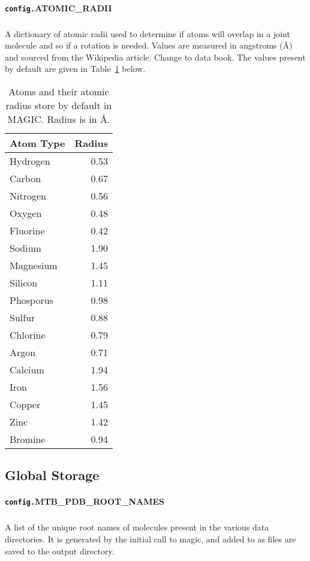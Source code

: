 \documentclass[a4paper,11pt,oneside,openright]{book}
\begin{document}
{\paragraph[\texttt{ATOMIC\_RADII}]{\texttt{config.}\textbf{ATOMIC\_RADII}}
\subparagraph{}A dictionary of atomic radii used to determine if atoms will overlap in a joint molecule and so if a rotation is needed. Values are measured in angstroms (\AA) and sourced from the Wikipedia article. {\color{red}Change to data book}. The values present by default are given in Table~\ref{tb:atomicradii} below.
\begin{table}[!htb]
\caption{Atoms and their atomic radius store by default in MAGIC. Radius is in \AA.}\label{tb:atomicradii}
\centering
\begin{tabular}{| l | r |}
\hline
Atom Type & Radius \\
\hline\hline
Hydrogen & 0.53 \\
Carbon & 0.67 \\
Nitrogen & 0.56 \\
Oxygen & 0.48 \\
Fluorine & 0.42 \\
Sodium & 1.90 \\
Magnesium & 1.45 \\
Silicon & 1.11 \\
Phosporus & 0.98 \\
Sulfur & 0.88 \\
Chlorine & 0.79 \\
Argon & 0.71 \\
Calcium & 1.94 \\
Iron & 1.56 \\
Copper & 1.45 \\
Zinc & 1.42 \\
Bromine & 0.94 \\
\hline
\end{tabular}
\end{table}
\subsection{Global Storage}
\paragraph[\texttt{MTB\_PDB\_ROOT\_NAMES}]{\texttt{config.}\textbf{MTB\_PDB\_ROOT\_NAMES}}
\subparagraph{}A list of the unique root names of molecules present in the various data directories. It is generated by the initial call to magic, and added to as files are saved to the output directory.
}
\end{document}
